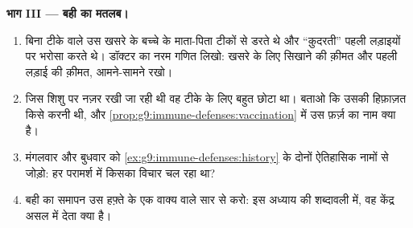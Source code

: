 \begin{problem}[{सप्ताहांत समस्या --- किसी स्वास्थ्य केंद्र का एक हफ़्ता,
प्रतिरक्षा वाले तरीक़े से पढ़ा हुआ}]
\medskip\noindent\textbf{भाग III --- बही का मतलब।}
\begin{enumerate}[resume]
  \item बिना टीके वाले उस खसरे के बच्चे के माता-पिता टीकों से डरते थे
        और ``क़ुदरती'' पहली लड़ाइयों पर भरोसा करते थे। डॉक्टर का नरम
        गणित लिखो: खसरे के लिए सिखाने की क़ीमत और पहली लड़ाई की
        क़ीमत, आमने-सामने रखो।
  \item जिस शिशु पर नज़र रखी जा रही थी वह टीके के लिए बहुत छोटा था।
        बताओ कि उसकी हिफ़ाज़त किसे करनी थी, और
        \cref{prop:g9:immune-defenses:vaccination} में उस फ़र्ज़ का नाम
        क्या है।
  \item मंगलवार और बुधवार को
        \cref{ex:g9:immune-defenses:history} के दोनों ऐतिहासिक नामों
        से जोड़ो: हर परामर्श में किसका विचार चल रहा था?
  \item बही का समापन उस हफ़्ते के एक वाक्य वाले सार से करो: इस अध्याय
        की शब्दावली में, वह केंद्र असल में देता क्या है।
\end{enumerate}
\end{problem}

